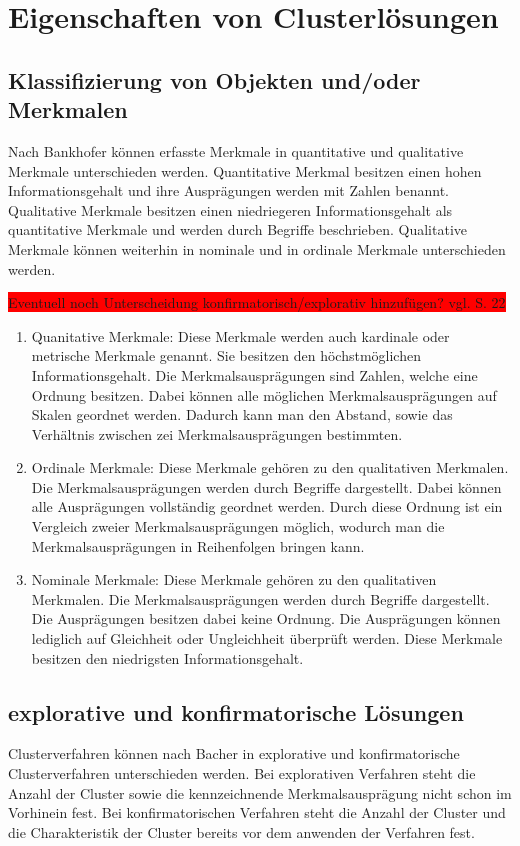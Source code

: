 \chapter{Eigenschaften von Clusterlösungen}

\section{Klassifizierung von Objekten und/oder Merkmalen}
Nach Bankhofer \cite{Bankhofer.2008} können erfasste Merkmale in quantitative und qualitative Merkmale unterschieden werden.
Quantitative Merkmal besitzen einen hohen Informationsgehalt und ihre Ausprägungen werden mit Zahlen benannt. Qualitative Merkmale besitzen einen niedriegeren Informationsgehalt als quantitative Merkmale und werden durch Begriffe beschrieben. Qualitative Merkmale können weiterhin in nominale und in ordinale Merkmale unterschieden werden.

\colorbox{red}{Eventuell noch Unterscheidung konfirmatorisch/explorativ hinzufügen? vgl. \cite{Bacher.2010} S. 22}

\begin{enumerate}
        \item Quanitative Merkmale: Diese Merkmale werden auch kardinale oder metrische Merkmale genannt. Sie besitzen den höchstmöglichen Informationsgehalt. Die Merkmalsausprägungen sind Zahlen, welche eine Ordnung besitzen. Dabei können alle möglichen Merkmalsausprägungen auf Skalen geordnet werden. Dadurch kann man den Abstand, sowie das Verhältnis zwischen zei Merkmalsausprägungen bestimmten.
        \item Ordinale Merkmale: Diese Merkmale gehören zu den qualitativen Merkmalen. Die Merkmalsausprägungen werden durch Begriffe dargestellt. Dabei können alle Ausprägungen vollständig geordnet werden. Durch diese Ordnung ist ein Vergleich zweier Merkmalsausprägungen möglich, wodurch man die Merkmalsausprägungen in Reihenfolgen bringen kann.
        \item Nominale Merkmale: Diese Merkmale gehören zu den qualitativen Merkmalen. Die Merkmalsausprägungen werden durch Begriffe dargestellt. Die Ausprägungen besitzen dabei keine Ordnung. Die Ausprägungen können lediglich auf Gleichheit oder Ungleichheit überprüft werden. Diese Merkmale besitzen den niedrigsten Informationsgehalt.
\end{enumerate}

\section{explorative und konfirmatorische Lösungen}
Clusterverfahren können nach Bacher \cite{Bacher.2010} in explorative und konfirmatorische Clusterverfahren unterschieden werden. 
Bei explorativen Verfahren steht die Anzahl der Cluster sowie die kennzeichnende Merkmalsausprägung nicht schon im Vorhinein fest.
Bei konfirmatorischen Verfahren steht die Anzahl der Cluster und die Charakteristik der Cluster bereits vor dem anwenden der Verfahren fest.

